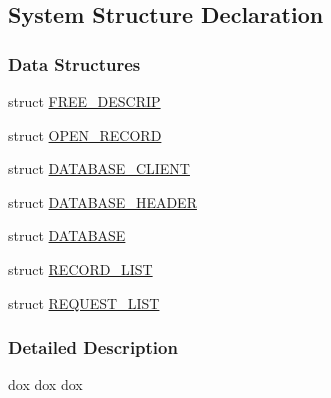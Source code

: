 \subsection{System Structure Declaration}
\label{group__mssectionh}
\subsubsection*{Data Structures}
\begin{DoxyCompactItemize}
\item 
struct \hyperlink{structFREE__DESCRIP}{FREE\_\-DESCRIP}
\item 
struct \hyperlink{structOPEN__RECORD}{OPEN\_\-RECORD}
\item 
struct \hyperlink{structDATABASE__CLIENT}{DATABASE\_\-CLIENT}
\item 
struct \hyperlink{structDATABASE__HEADER}{DATABASE\_\-HEADER}
\item 
struct \hyperlink{structDATABASE}{DATABASE}
\item 
struct \hyperlink{structRECORD__LIST}{RECORD\_\-LIST}
\item 
struct \hyperlink{structREQUEST__LIST}{REQUEST\_\-LIST}
\end{DoxyCompactItemize}


\subsubsection{Detailed Description}
dox dox dox 